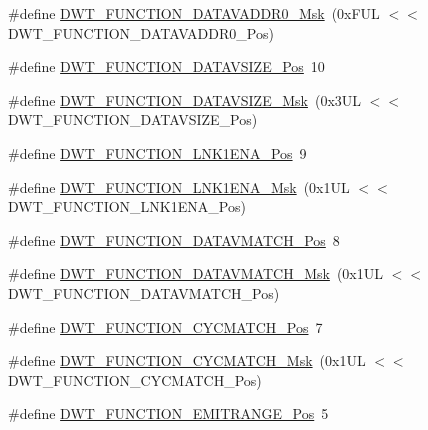 \begin{DoxyCompactItemize}
\item 
\#define \hyperlink{group___c_m_s_i_s___d_w_t_gafc5efbe8f9b51e04aecd00c8a4eb50fb}{D\+W\+T\+\_\+\+F\+U\+N\+C\+T\+I\+O\+N\+\_\+\+D\+A\+T\+A\+V\+A\+D\+D\+R0\+\_\+\+Msk}~(0x\+F\+U\+L $<$$<$ D\+W\+T\+\_\+\+F\+U\+N\+C\+T\+I\+O\+N\+\_\+\+D\+A\+T\+A\+V\+A\+D\+D\+R0\+\_\+\+Pos)
\item 
\#define \hyperlink{group___c_m_s_i_s___d_w_t_ga0517a186d4d448aa6416440f40fe7a4d}{D\+W\+T\+\_\+\+F\+U\+N\+C\+T\+I\+O\+N\+\_\+\+D\+A\+T\+A\+V\+S\+I\+Z\+E\+\_\+\+Pos}~10
\item 
\#define \hyperlink{group___c_m_s_i_s___d_w_t_gaab42cbc1e6084c44d5de70971613ea76}{D\+W\+T\+\_\+\+F\+U\+N\+C\+T\+I\+O\+N\+\_\+\+D\+A\+T\+A\+V\+S\+I\+Z\+E\+\_\+\+Msk}~(0x3\+U\+L $<$$<$ D\+W\+T\+\_\+\+F\+U\+N\+C\+T\+I\+O\+N\+\_\+\+D\+A\+T\+A\+V\+S\+I\+Z\+E\+\_\+\+Pos)
\item 
\#define \hyperlink{group___c_m_s_i_s___d_w_t_ga89d7c48858b4d4de96cdadfac91856a1}{D\+W\+T\+\_\+\+F\+U\+N\+C\+T\+I\+O\+N\+\_\+\+L\+N\+K1\+E\+N\+A\+\_\+\+Pos}~9
\item 
\#define \hyperlink{group___c_m_s_i_s___d_w_t_ga64bd419260c3337cacf93607d1ad27ac}{D\+W\+T\+\_\+\+F\+U\+N\+C\+T\+I\+O\+N\+\_\+\+L\+N\+K1\+E\+N\+A\+\_\+\+Msk}~(0x1\+U\+L $<$$<$ D\+W\+T\+\_\+\+F\+U\+N\+C\+T\+I\+O\+N\+\_\+\+L\+N\+K1\+E\+N\+A\+\_\+\+Pos)
\item 
\#define \hyperlink{group___c_m_s_i_s___d_w_t_ga106f3672cd4be7c7c846e20497ebe5a6}{D\+W\+T\+\_\+\+F\+U\+N\+C\+T\+I\+O\+N\+\_\+\+D\+A\+T\+A\+V\+M\+A\+T\+C\+H\+\_\+\+Pos}~8
\item 
\#define \hyperlink{group___c_m_s_i_s___d_w_t_ga32af1f1c0fcd2d8d9afd1ad79cd9970e}{D\+W\+T\+\_\+\+F\+U\+N\+C\+T\+I\+O\+N\+\_\+\+D\+A\+T\+A\+V\+M\+A\+T\+C\+H\+\_\+\+Msk}~(0x1\+U\+L $<$$<$ D\+W\+T\+\_\+\+F\+U\+N\+C\+T\+I\+O\+N\+\_\+\+D\+A\+T\+A\+V\+M\+A\+T\+C\+H\+\_\+\+Pos)
\item 
\#define \hyperlink{group___c_m_s_i_s___d_w_t_ga4b65d79ca37ae8010b4a726312413efd}{D\+W\+T\+\_\+\+F\+U\+N\+C\+T\+I\+O\+N\+\_\+\+C\+Y\+C\+M\+A\+T\+C\+H\+\_\+\+Pos}~7
\item 
\#define \hyperlink{group___c_m_s_i_s___d_w_t_ga8e2ed09bdd33a8f7f7ce0444f5f3bb25}{D\+W\+T\+\_\+\+F\+U\+N\+C\+T\+I\+O\+N\+\_\+\+C\+Y\+C\+M\+A\+T\+C\+H\+\_\+\+Msk}~(0x1\+U\+L $<$$<$ D\+W\+T\+\_\+\+F\+U\+N\+C\+T\+I\+O\+N\+\_\+\+C\+Y\+C\+M\+A\+T\+C\+H\+\_\+\+Pos)
\item 
\#define \hyperlink{group___c_m_s_i_s___d_w_t_ga41d5b332216baa8d29561260a1b85659}{D\+W\+T\+\_\+\+F\+U\+N\+C\+T\+I\+O\+N\+\_\+\+E\+M\+I\+T\+R\+A\+N\+G\+E\+\_\+\+Pos}~5
$$
\end{DoxyCompactItemize}
